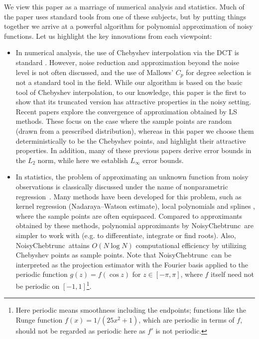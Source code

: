 \documentclass[final,onefignum,onetabnum]{siamart220329}
\def\mainalg{NoisyChebtrunc}
\begin{document}
We view this paper as a marriage of numerical analysis and statistics. Much of the paper uses standard tools from one of these subjects, but by putting things together we arrive at a powerful algorithm for polynomial approximation of noisy functions. 
Let us highlight the key innovations from each viewpoint:
\begin{itemize}
	\item In numerical analysis, the use of Chebyshev interpolation via the DCT is standard \cite{trefethenatap}. However, noise reduction 
	and approximation beyond the noise level is not often discussed, and the use of Mallows' $C_p$ for degree selection is not a standard tool in the field. While our algorithm is based on the basic tool of Chebyshev interpolation, to our knowledge, this paper is the first to show that its truncated version has attractive properties in the noisy setting. Recent papers \cite{cohen2013stability,cohen2,migliorati2015convergence} explore the convergence of approximation obtained by LS methods. These focus on the case where the sample points are random (drawn from a prescribed distribution), whereas in this paper we choose them deterministically to be the Chebyshev points, and highlight their attractive properties. In addition, many of these previous papers derive error bounds in the $L_2$ norm, while here we establish $L_{\infty}$ error bounds. 
	\item In statistics, 
	the problem of approximating an unknown function from noisy observations is classically discussed under the name of nonparametric regression~\cite[Ch.~5]{wasserman2006all}. 
	Many methods have been developed for this problem, such as kernel regression (Nadaraya--Watson estimate), local polynomials and splines \cite{tsybakov,wasserman2006all}, where the sample points are often equispaced. 
	Compared to approximants obtained by these methods, polynomial approximants by \mainalg\ are simpler to work with (e.g. to differentiate, integrate or find roots). 
	Also, \mainalg\ attains $O(N\log N)$ computational efficiency  by utilizing Chebyshev points as sample points.
	Note that \mainalg\ can be interpreted as the projection estimator with the Fourier basis \cite[Sec.~1.7]{tsybakov} applied to the periodic function $g(z)=f(\cos z)$ for $z \in [-\pi,\pi]$, where $f$ itself need not be periodic on $[-1,1]$\footnote{Here periodic means smoothness including the endpoints; functions like the Runge function $f(x)=1/(25x^2+1)$, which are periodic in terms of $f$, should not be regarded as periodic here as $f'$ is not periodic.}.
	

\end{itemize}
\end{document}
